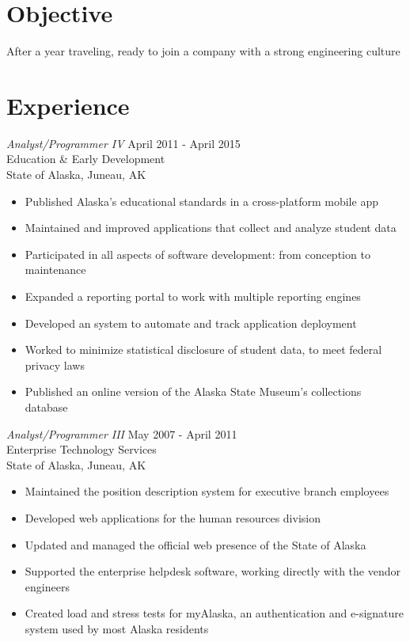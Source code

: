 \documentclass[line,margin]{res}
\begin{document}
\address{\href{mailto:amiller@alumni.uidaho.edu}{amiller@alumni.uidaho.edu}\\ (253) 336-6451}
\address{PO Box 7130\\ New York, NY 10116}
 
\begin{resume}
 
\section{Objective}       After a year traveling, ready to join a company with a strong engineering culture
\section{Experience} {\sl Analyst/Programmer IV} \hfill April 2011 - April 2015 \\
		Education \& Early Development \\
                State of Alaska, Juneau, AK
                \begin{itemize}  \itemsep -2pt %
        \item Published Alaska's educational standards in a cross-platform mobile app
        \item Maintained and improved applications that collect and analyze student data
		\item Participated in all aspects of software development: from conception to maintenance
		\item Expanded a reporting portal to work with multiple reporting engines
		\item Developed an system to automate and track application deployment 
		\item Worked to minimize statistical disclosure of student data, to meet federal privacy laws
		\item Published an online version of the Alaska State Museum's collections database
                \end{itemize}

		{\sl Analyst/Programmer III} \hfill May 2007 - April 2011 \\
                Enterprise Technology Services \\
                State of Alaska, Juneau, AK
                \begin{itemize}  \itemsep -2pt %
        \item Maintained the position description system for executive branch employees
        \item Developed web applications for the human resources division
		\item Updated and managed the official web presence of the State of Alaska
		\item Supported the enterprise helpdesk software, working directly with the vendor engineers
		\item Created load and stress tests for myAlaska, an authentication and e-signature system used by most Alaska residents
                \end{itemize}
 

\end{resume}
\end{document}
